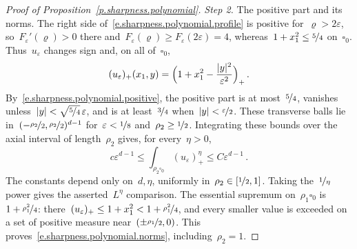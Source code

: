 \documentclass[11pt,letterpaper]{article}
\numberwithin{equation}{section}
\theoremstyle{definition}
\newcommand{\eps}{\varepsilon}
\newcommand{\nf}{\nicefrac}
\newcommand{\cu}{\square}
\begin{document}
\begin{proof}[Proof of Proposition~\ref{p.sharpness.polynomial}]
\smallskip
\emph{Step 2.} The positive part and its norms. The right side of~\eqref{e.sharpness.polynomial.profile} is positive for~$\varrho>2\eps$, so~$F_\eps'(\varrho)>0$ there and~$F_\eps(\varrho)\geq F_\eps(2\eps)=4$, whereas~$1+x_1^2\leq\nf54$ on~$\cu_0$. Thus~$u_\eps$ changes sign and, on all of~$\cu_0$,
\begin{equation}
	(u_\eps)_+(x_1,y)=\Bigl(1+x_1^2-\frac{|y|^2}{\eps^2}\Bigr)_+\,.
	\label{e.sharpness.polynomial.positive}
\end{equation}
By~\eqref{e.sharpness.polynomial.positive}, the positive part is at most~$\nf54$, vanishes unless~$|y|<\sqrt{\nf54}\,\eps$, and is at least~$\nf34$ when~$|y|<\nf\eps2$. These transverse balls lie in~$(-\nf{\rho_2}2,\nf{\rho_2}2)^{d-1}$ for~$\eps<\nf18$ and~$\rho_2\geq\nf12$. Integrating these bounds over the axial interval of length~$\rho_2$ gives, for every~$\eta>0$,
\begin{equation*}
	c\eps^{d-1}\leq\int_{\rho_2\cu_0}(u_\eps)_+^\eta\leq C\eps^{d-1}\,.
\end{equation*}
The constants depend only on~$d,\eta$, uniformly in~$\rho_2\in[\nf12,1]$. Taking the~$\nf1\eta$ power gives the asserted~$L^\eta$ comparison. The essential supremum on~$\rho_1\cu_0$ is~$1+\nf{\rho_1^2}4$: there~$(u_\eps)_+\leq1+x_1^2<1+\nf{\rho_1^2}4$, and every smaller value is exceeded on a set of positive measure near~$(\pm\nf{\rho_1}2,0)$. This proves~\eqref{e.sharpness.polynomial.norms}, including~$\rho_2=1$.


\end{proof}
\end{document}
